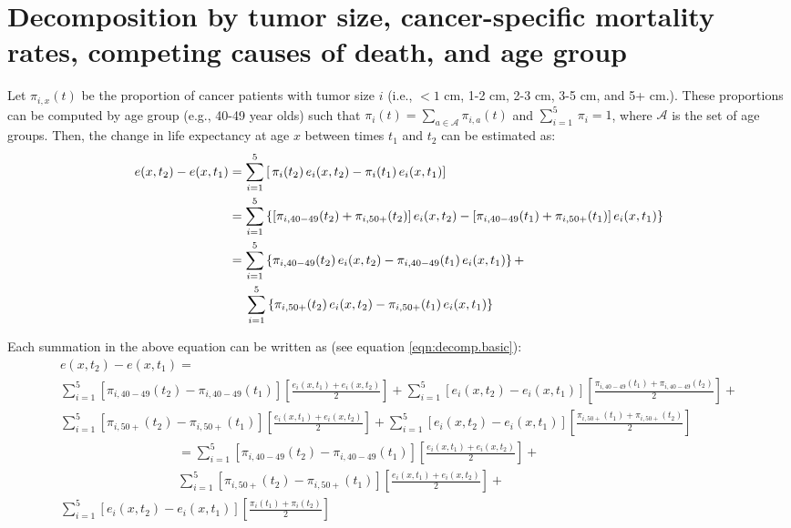 \documentclass[12pt,letterpaper]{article}
\theoremstyle{plain}
\begin{document}
\section*{Decomposition by tumor size, cancer-specific mortality
  rates, competing causes of death, and age group}
Let $\pi_{i,x}(t)$ be the proportion of cancer patients with tumor
size $i$ (i.e., $<1$ cm, 1-2 cm, 2-3 cm, 3-5 cm, and 5+ cm.). These
proportions can be computed by age group (e.g., 40-49 year olds) such
that $\pi_i(t)=\sum_{a\in\mathcal{A}}\pi_{i,a}(t)$ and $\sum_{i=1}^{5}\,\pi_i=1$, where
$\mathcal{A}$ is the set of age groups.  Then, the change in life
expectancy at age $x$ between times $t_1$ and $t_2$ can be estimated
as: 
\begin{align*}
  e(x,t_2)-e(x,t_1)&=\sum_{i=1}^{5}\left[\,\pi_i(t_2)\,e_i(x,t_2)- \pi_i(t_1)\,e_i(x,t_1)\right] \notag\\
  &= \sum_{i=1}^{5}\left\{[\pi_{i,40-49}(t_2)+\pi_{i,50+}(t_2)]\,e_i(x,t_2)- [\pi_{i,40-49}(t_1)+\pi_{i,50+}(t_1)]\,e_i(x,t_1)\right\}\notag \\
  &=\sum_{i=1}^{5}\left\{\pi_{i,40-49}(t_2)\,e_i(x,t_2)-
    \pi_{i,40-49}(t_1)\,e_i(x,t_1)\right\} +\\
  &\hspace{0.18in}\sum_{i=1}^{5}\left\{\pi_{i,50+}(t_2)\,e_i(x,t_2)- \pi_{i,50+}(t_1)\,e_i(x,t_1)\right\} \notag 
 \end{align*}

Each summation in the above equation can be written as (see equation \eqref{eqn:decomp.basic}):
\begin{multline}
e(x,t_2)-e(x,t_1)= \\
\sum_{i=1}^{5}\left[\pi_{i,40-49}(t_2)-\pi_{i,40-49}(t_1) \right]\left[\frac{e_i(x,t_1)+e_i(x,t_2)}{2}\right]+\sum_{i=1}^{5}\left[e_i(x,t_2)-e_i(x,t_1) \right]\left[\frac{\pi_{i,40-49}(t_1)+\pi_{i,40-49}(t_2)}{2}\right] +\\
\sum_{i=1}^{5}\left[\pi_{i,50+}(t_2)-\pi_{i,50+}(t_1) \right]\left[\frac{e_i(x,t_1)+e_i(x,t_2)}{2}\right]+\sum_{i=1}^{5}\left[e_i(x,t_2)-e_i(x,t_1) \right]\left[\frac{\pi_{i,50+}(t_1)+\pi_{i,50+}(t_2)}{2}\right] \\
\phantom{e(x,t_2)-e(x,t_1)}= \sum_{i=1}^{5}\left[\pi_{i,40-49}(t_2)-\pi_{i,40-49}(t_1) \right]\left[\frac{e_i(x,t_1)+e_i(x,t_2)}{2}\right] + \\
\phantom{e(x,t_2)-e(x,t_1)} \sum_{i=1}^{5}\left[\pi_{i,50+}(t_2)-\pi_{i,50+}(t_1) \right]\left[\frac{e_i(x,t_1)+e_i(x,t_2)}{2}\right] + \\
\sum_{i=1}^{5}\left[e_i(x,t_2)-e_i(x,t_1) \right]\left[\frac{\pi_i(t_1)+\pi_i(t_2)}{2}\right]
\label{agedec}
\end{multline}
\end{document}
